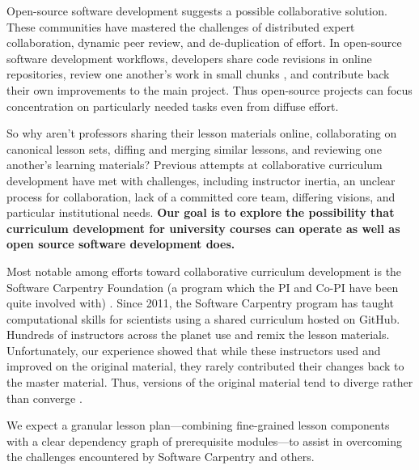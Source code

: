 \documentclass[11pt]{article}
\begin{document}
          Open-source software development suggests a possible collaborative solution.
          These communities have mastered the challenges of distributed expert collaboration, 
          dynamic peer review, and de-duplication of effort. In open-source 
          software development workflows, developers share code revisions in online repositories, 
          review one another's work in small chunks \cite{wilson_best_2014}, 
          and contribute back their own improvements to the main project.
          Thus open-source projects can focus concentration on particularly needed tasks
          even from diffuse effort.

          So why aren't professors sharing their lesson materials online, 
          collaborating on canonical lesson sets, diffing and merging similar 
          lessons, and reviewing one another's learning materials?
          Previous attempts at collaborative curriculum development have met with 
          challenges, including instructor inertia, an unclear process for collaboration,
          lack of a committed core team, differing visions, and particular institutional needs.
          \textbf{Our goal is to explore the possibility that curriculum development for 
          university courses can operate as well as open source software development 
          does.}
          
          Most notable among efforts toward collaborative curriculum 
          development is the Software Carpentry Foundation (a program
          which the PI and Co-PI have been quite involved with) 
          \cite{wilson_software_2014}.  Since 2011, the Software Carpentry program has taught 
          computational skills for scientists using a shared curriculum hosted 
          on GitHub. Hundreds of instructors across the planet use and remix 
          the lesson materials. Unfortunately, our experience showed that while these 
          instructors used and improved on the original material, they rarely 
          contributed their changes back to the master material. Thus, versions 
          of the original material tend to diverge rather than converge 
          \cite{wilson_software_2014,wilson_software_2014-1}.
          
          We expect a granular lesson plan---combining fine-grained lesson components
          with a clear dependency graph of prerequisite modules---to assist in 
          overcoming the challenges encountered by Software Carpentry and 
          others.
\end{document}
